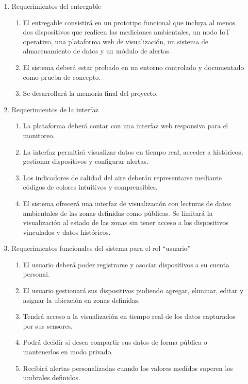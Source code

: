\documentclass[
11pt, %
]{charter}
\begin{document}
\begin{enumerate}
	\item Requerimientos del entregable
	\begin{enumerate}
		\item El entregable consistirá en un prototipo funcional que incluya al menos dos dispositivos que realicen las mediciones ambientales, un nodo IoT operativo, una plataforma web de visualización, un sistema de almacenamiento de datos y un módulo de alertas.
		\item El sistema deberá estar probado en un entorno controlado y documentado como prueba de concepto.
		\item Se desarrollará la memoria final del proyecto.

	\end{enumerate}
	
	\item Requerimientos de la interfaz
	\begin{enumerate}
		\item La plataforma deberá contar con una interfaz web responsiva para el monitoreo.
		\item La interfaz permitirá visualizar datos en tiempo real, acceder a históricos, gestionar dispositivos y configurar alertas.
		\item Los indicadores de calidad del aire deberán representarse mediante códigos de colores intuitivos y comprensibles.
		\item El sistema ofrecerá una interfaz de visualización con lecturas de datos ambientales de las zonas definidas como públicas. Se limitará la visualización al estado de las zonas sin tener acceso a los dispositivos vinculados y datos históricos.

	\end{enumerate}

	\item Requerimientos funcionales del sistema para el rol “usuario”
	\begin{enumerate}
		\item El usuario deberá poder registrarse y asociar dispositivos a su cuenta personal.
		\item El usuario gestionará sus dispositivos pudiendo agregar, eliminar, editar y asignar la ubicación en zonas definidas.
		\item Tendrá acceso a la visualización en tiempo real de los datos capturados por sus sensores.
		\item Podrá decidir si desea compartir sus datos de forma pública o mantenerlos en modo privado.
		\item Recibirá alertas personalizadas cuando los valores medidos superen los umbrales definidos.


\end{enumerate}
\end{enumerate}
\end{document}
